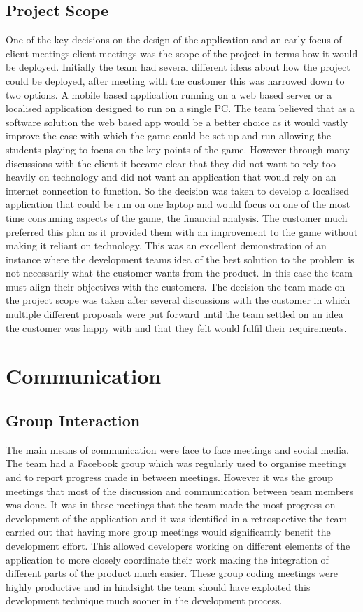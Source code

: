 \documentclass{l3proj}
\begin{document}
\subsection{Project Scope}
One of the key decisions on the design of the application and an early focus of client meetings client meetings was the scope of the project in terms how it would be deployed. Initially the team had several different ideas about how the project could be deployed, after meeting with the customer this was narrowed down to two options. A mobile based application running on a web based server or a localised application designed to run on a single PC. The team believed that as a software solution the web based app would be a better choice as it would vastly improve the ease with which the game could be set up and run allowing the students playing to focus on the key points of the game. However through many discussions with the client it became clear that they did not want to rely too heavily on technology and did not want an application that would rely on an internet connection to function. So the decision was taken to develop a localised application that could be run on one laptop and would focus on one of the most time consuming aspects of the game, the financial analysis. The customer much preferred this plan as it provided them with an improvement to the game without making it reliant on technology. This was an excellent demonstration of an instance where the development teams idea of the best solution to the problem is not necessarily what the customer wants from the product. In this case the team must align their objectives with the customers. The decision the team made on the project scope was taken after several discussions with the customer in which multiple different proposals were put forward until the team settled on an idea the customer was happy with and that they felt would fulfil their requirements.
\section{Communication}
\label{sec:communication}

\subsection{Group Interaction}
The main means of communication were face to face meetings and social media. The team had a Facebook group which was regularly used to organise meetings and to report progress made in between meetings. However it was the group meetings that most of the discussion and communication between team members was done. It was in these meetings that the team made the most progress on development of the application and it was identified in a retrospective the team carried out that having more group meetings would significantly benefit the development effort. This allowed developers working on different elements of the application to more closely coordinate their work making the integration of different parts of the product much easier. These group coding meetings were highly productive and in hindsight the team should have exploited this development technique much sooner in the development process.
\end{document}
